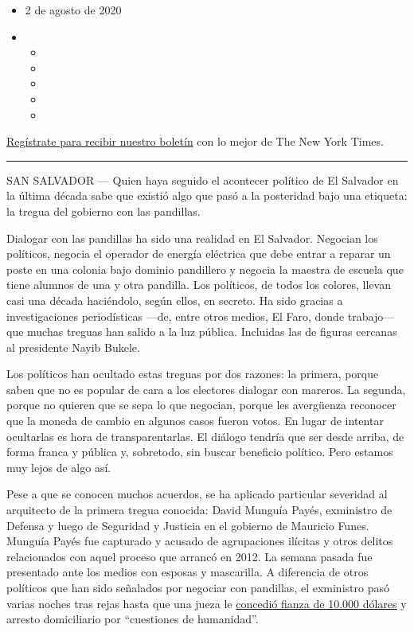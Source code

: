 \begin{itemize}
\item
  2 de agosto de 2020
\item
  \begin{itemize}
  \item
  \item
  \item
  \item
  \item
  \end{itemize}
\end{itemize}

\href{https://www.nytimes.com/newsletters/el-times}{Regístrate para
recibir nuestro boletín} con lo mejor de The New York Times.

\begin{center}\rule{0.5\linewidth}{\linethickness}\end{center}

SAN SALVADOR --- Quien haya seguido el acontecer político de El Salvador
en la última década sabe que existió algo que pasó a la posteridad bajo
una etiqueta: la tregua del gobierno con las pandillas.

Dialogar con las pandillas ha sido una realidad en El Salvador. Negocian
los políticos, negocia el operador de energía eléctrica que debe entrar
a reparar un poste en una colonia bajo dominio pandillero y negocia la
maestra de escuela que tiene alumnos de una y otra pandilla. Los
políticos, de todos los colores, llevan casi una década haciéndolo,
según ellos, en secreto. Ha sido gracias a investigaciones periodísticas
---de, entre otros medios, El Faro, donde trabajo--- que muchas treguas
han salido a la luz pública. Incluidas las de figuras cercanas al
presidente Nayib Bukele.

Los políticos han ocultado estas treguas por dos razones: la primera,
porque saben que no es popular de cara a los electores dialogar con
mareros. La segunda, porque no quieren que se sepa lo que negocian,
porque les avergüenza reconocer que la moneda de cambio en algunos casos
fueron votos. En lugar de intentar ocultarlas es hora de
transparentarlas. El diálogo tendría que ser desde arriba, de forma
franca y pública y, sobretodo, sin buscar beneficio político. Pero
estamos muy lejos de algo así.

Pese a que se conocen muchos acuerdos, se ha aplicado particular
severidad al arquitecto de la primera tregua conocida: David Munguía
Payés, exministro de Defensa y luego de Seguridad y Justicia en el
gobierno de Mauricio Funes. Munguía Payés fue capturado y acusado de
agrupaciones ilícitas y otros delitos relacionados con aquel proceso que
arrancó en 2012. La semana pasada fue presentado ante los medios con
esposas y mascarilla. A diferencia de otros políticos que han sido
señalados por negociar con pandillas, el exministro pasó varias noches
tras rejas hasta que una jueza le
\href{https://www.laprensagrafica.com/elsalvador/Imponen-10000-de-fianza-y-arresto-domiciliario-a-Payes-20200729-0084.html}{concedió
fianza de 10.000 dólares} y arresto domiciliario por ``cuestiones de
humanidad''.

